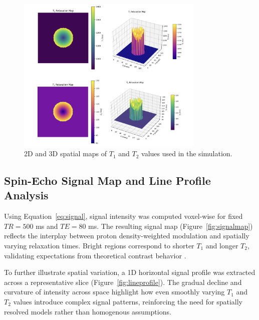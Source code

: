 \documentclass[10pt,a4paper,twoside]{article}
\begin{document}
\begin{figure}[htbp!]
\centering
\includegraphics[width=0.8\textwidth]{t1t2maps.png}
\caption{2D and 3D spatial maps of \( T_1 \) and \( T_2 \) values used in the simulation.}
\label{fig:t1t2maps}
\end{figure}


\subsection{Spin-Echo Signal Map and Line Profile Analysis}

Using Equation~\eqref{eq:signal}, signal intensity was computed voxel-wise for fixed \( TR = 500 \) ms and \( TE = 80 \) ms. The resulting signal map (Figure~\ref{fig:signalmap}) reflects the interplay between proton density-weighted modulation and spatially varying relaxation times. Bright regions correspond to shorter \( T_1 \) and longer \( T_2 \), validating expectations from theoretical contrast behavior \cite{bernstein2004, brown2014}.

To further illustrate spatial variation, a 1D horizontal signal profile was extracted across a representative slice (Figure~\ref{fig:lineprofile}). The gradual decline and curvature of intensity across space highlight how even smoothly varying \( T_1 \) and \( T_2 \) values introduce complex signal patterns, reinforcing the need for spatially resolved models rather than homogenous assumptions.
\end{document}

